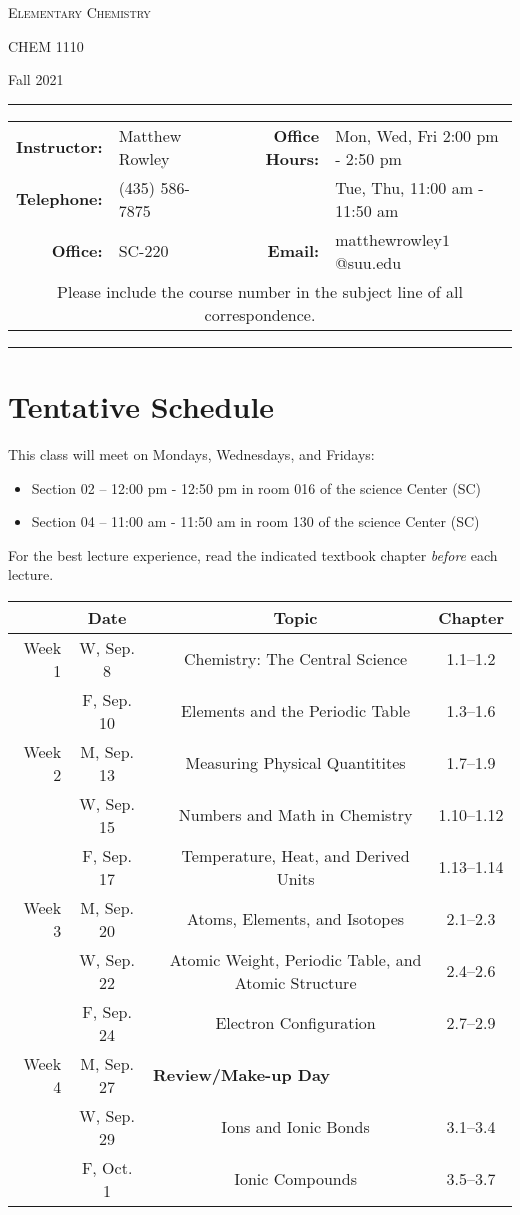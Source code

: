 \documentclass[12pt, letterpaper]{article}
\begin{document}
\begin{center}
	{\Large \textsc{Elementary Chemistry}}
	
	CHEM 1110
\end{center}
\begin{center}
	{\large Fall 2021}
\end{center}
\begin{center}
	\rule{\textwidth}{0.4pt}
	\begin{tabular}{rlcrl}
		\textbf{Instructor:} & Matthew Rowley & & \textbf{Office Hours:} & Mon, Wed, Fri 2:00 pm - 2:50 pm \\
		\textbf{Telephone:} & (435) 586-7875 & & & Tue, Thu, 11:00 am - 11:50 am\\
		\textbf{Office:} & SC-220 & & \textbf{Email:} & matthewrowley$1$@suu.edu\\
		\multicolumn{5}{c}{Please include the course number in the subject line of all correspondence.} 
	\end{tabular}
	\rule{\textwidth}{0.4pt}
\end{center}

\section*{Tentative Schedule}
This class will meet on Mondays, Wednesdays, and Fridays:
\begin{itemize}
	\item Section 02 -- 12:00 pm - 12:50 pm in room 016 of the science Center (SC)
	\item Section 04 -- 11:00 am - 11:50 am in room 130 of the science Center (SC)
\end{itemize} 

\noindent For the best lecture experience, read the indicated textbook chapter \emph{before} each lecture.

\noindent
\begin{tabular}{rcccc}
	& Date && Topic & Chapter\\
	\midrule
	Week 1 & W, Sep. 8&& Chemistry: The Central Science & 1.1--1.2\\
	& F, Sep. 10&& Elements and the Periodic Table & 1.3--1.6\\
	\midrule
	Week 2 & M, Sep. 13&& Measuring Physical Quantitites & 1.7--1.9\\
	& W, Sep. 15&& Numbers and Math in Chemistry & 1.10--1.12\\
	& F, Sep. 17&& Temperature, Heat, and Derived Units & 1.13--1.14\\
	\midrule
	Week 3 & M, Sep. 20&& Atoms, Elements, and Isotopes & 2.1--2.3\\
	& W, Sep. 22&& Atomic Weight, Periodic Table, and Atomic Structure & 2.4--2.6\\
	& F, Sep. 24&& Electron Configuration & 2.7--2.9\\
	\midrule
	Week 4 & M, Sep. 27& \multicolumn{3}{l}{\textbf{Review/Make-up Day}}\\
	& W, Sep. 29&& Ions and Ionic Bonds & 3.1--3.4\\
	& F, Oct. 1&& Ionic Compounds & 3.5--3.7\\
\end{tabular}
\end{document}

